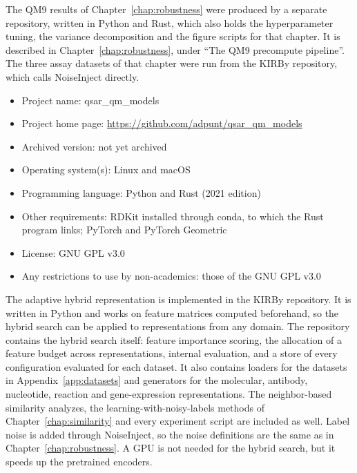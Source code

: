 The QM9 results of Chapter~\ref{chap:robustness} were produced by a separate repository, written in Python and Rust, which also holds the hyperparameter tuning, the variance decomposition and the figure scripts for that chapter. It is described in Chapter~\ref{chap:robustness}, under ``The QM9 precompute pipeline''. The three assay datasets of that chapter were run from the KIRBy repository, which calls NoiseInject directly.

\begin{itemize}
    \item Project name: qsar\_qm\_models
    \item Project home page: \url{https://github.com/adpunt/qsar_qm_models}
    \item Archived version: not yet archived
    \item Operating system(s): Linux and macOS
    \item Programming language: Python and Rust (2021 edition)
    \item Other requirements: RDKit installed through conda, to which the Rust program links; PyTorch and PyTorch Geometric
    \item License: GNU GPL v3.0
    \item Any restrictions to use by non-academics: those of the GNU GPL v3.0
\end{itemize}

The adaptive hybrid representation is implemented in the KIRBy repository. It is written in Python and works on feature matrices computed beforehand, so the hybrid search can be applied to representations from any domain. The repository contains the hybrid search itself: feature importance scoring, the allocation of a feature budget across representations, internal evaluation, and a store of every configuration evaluated for each dataset. It also contains loaders for the datasets in Appendix~\ref{app:datasets} and generators for the molecular, antibody, nucleotide, reaction and gene-expression representations. The neighbor-based similarity analyzes, the learning-with-noisy-labels methods of Chapter~\ref{chap:similarity} and every experiment script are included as well. Label noise is added through NoiseInject, so the noise definitions are the same as in Chapter~\ref{chap:robustness}. A GPU is not needed for the hybrid search, but it speeds up the pretrained encoders.

